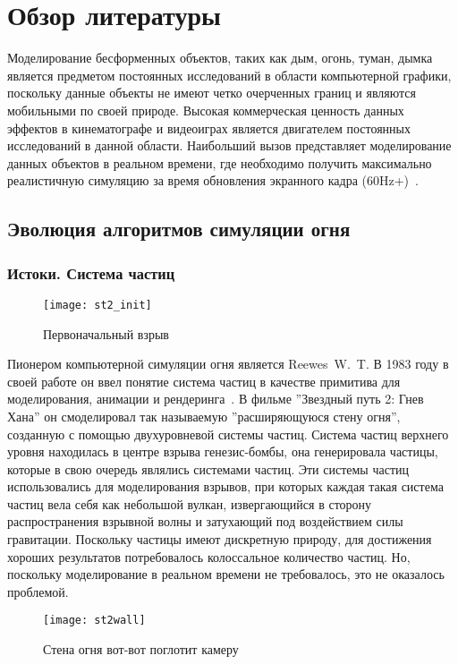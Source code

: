 \chapter{Обзор литературы}

Моделирование бесформенных объектов, таких как дым, огонь, туман, дымка является
предметом постоянных исследований в области компьютерной графики, поскольку
данные объекты не имеют четко очерченных границ и являются мобильными по своей
природе. Высокая коммерческая ценность данных эффектов в кинематографе и
видеоиграх является двигателем постоянных исследований в данной области.
Наибольший вызов представляет моделирование данных объектов в реальном времени,
где необходимо получить максимально реалистичную симуляцию за время обновления
экранного кадра (60Hz+)~\cite{lec17}.

\section{Эволюция алгоритмов симуляции огня}
\subsection{Истоки. Система частиц}
\begin{figure}[htb]
	\centering
	\texttt{[image: st2\_init]}
	\caption{Первоначальный взрыв}
\end{figure}
Пионером компьютерной симуляции огня является Reewes~W.~T. В 1983 году в своей
работе он ввел понятие система частиц в качестве примитива для моделирования,
анимации и рендеринга~\cite{reewes1983}. В фильме ''Звездный путь 2: Гнев Хана''
он смоделировал так называемую ''расширяющуюся стену огня'', созданную с помощью
двухуровневой системы частиц. Система частиц верхнего уровня находилась в центре
взрыва генезис-бомбы, она генерировала частицы, которые в свою очередь являлись
системами частиц. Эти системы частиц использовались для моделирования взрывов,
при которых каждая такая система частиц вела себя как небольшой вулкан,
извергающийся в сторону распространения взрывной волны и затухающий под
воздействием силы гравитации. Поскольку частицы имеют дискретную природу, для
достижения хороших результатов потребовалось колоссальное количество частиц. Но,
поскольку моделирование в реальном времени не требовалось, это не оказалось
проблемой.
\begin{figure}[htb]
	\centering
	\texttt{[image: st2wall]}
	\caption{Стена огня вот-вот поглотит камеру}
\end{figure}

